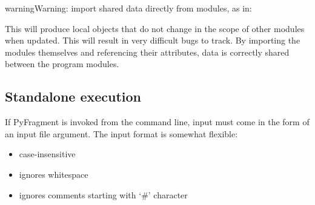 \documentclass[letterpaper,10pt,english]{sphinxmanual}
\begin{document}
\begin{sphinxVerbatim}[commandchars=\\\{\}]
    
   
\end{sphinxVerbatim}

\begin{sphinxadmonition}{warning}{Warning:}
 import shared data directly from modules, as in:

\begin{sphinxVerbatim}[commandchars=\\\{\}]
   
\end{sphinxVerbatim}

This will produce local objects that do not change in the scope of other
modules when updated. This will result in very difficult bugs to track. By
importing the modules themselves and referencing their attributes,
data is correctly shared between the program modules.
\end{sphinxadmonition}


\subsection{Standalone execution}
\label{\detokenize{inputfile:standalone-execution}}
If PyFragment is invoked from the command line, input must come in
the form of an input file argument. The input format is somewhat flexible:
\begin{itemize}
\item {} 
case-insensitive

\item {} 
ignores whitespace

\item {} 
ignores comments starting with `\#' character

\end{itemize}
\end{document}
